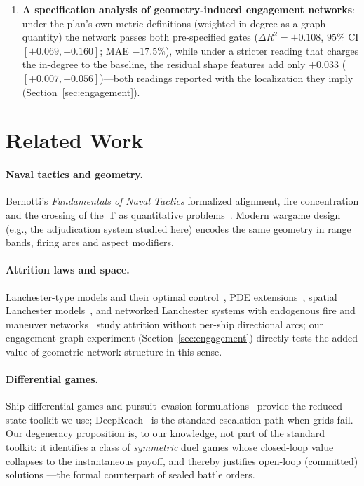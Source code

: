 \documentclass[12pt,a4paper]{article}
\begin{document}
\begin{enumerate}
through a translation layer that emits only legal orders, evaluated with
paired seeds against doctrine baselines (Section~\ref{sec:validation}).
\item \textbf{A specification analysis of geometry-induced engagement
networks}: under the plan's own metric definitions (weighted in-degree as
a graph quantity) the network passes both pre-specified gates
($\Delta R^2 = +0.108$, $95\%$ CI $[+0.069,+0.160]$; MAE $-17.5\%$),
while under a stricter reading that charges the in-degree to the
baseline, the residual shape features add only $+0.033$
($[+0.007,+0.056]$)---both readings reported with the localization they
imply (Section~\ref{sec:engagement}).
\end{enumerate}

\section{Related Work}\label{sec:related}

\paragraph{Naval tactics and geometry.}  Bernotti's \emph{Fundamentals of
Naval Tactics} formalized alignment, fire concentration and the crossing
of the~T as quantitative problems~\citep{bernotti1911,bernotti1912}.
Modern wargame design (e.g., the adjudication system studied here)
encodes the same geometry in range bands, firing arcs and aspect modifiers.

\paragraph{Attrition laws and space.}  Lanchester-type models and their
optimal control~\citep{taylor1974}, PDE extensions~\citep{protopopescu1989},
spatial Lanchester models~\citep{gonzalez2011}, and networked
Lanchester systems with endogenous fire and maneuver
networks~\citep{networked2020} study attrition without per-ship directional
arcs; our engagement-graph experiment (Section~\ref{sec:engagement})
directly tests the added value of geometric network structure in this
sense.

\paragraph{Differential games.}  Ship differential games and pursuit--evasion
formulations~\citep{solis2020,weintraub2020,cubic1993} provide the
reduced-state toolkit we use; DeepReach~\citep{bansal2021} is the standard
escalation path when grids fail.  Our degeneracy proposition is, to our
knowledge, not part of the standard toolkit: it identifies a class of
\emph{symmetric} duel games whose closed-loop value collapses to the
instantaneous payoff, and thereby justifies open-loop (committed) solutions
---the formal counterpart of sealed battle orders.
\end{document}

